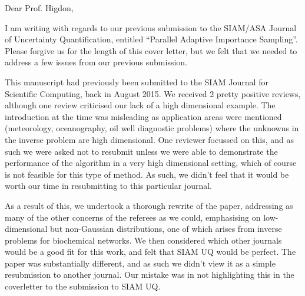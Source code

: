 \documentclass{letter}
\begin{document}
\date{}
\begin{letter}{ }

\opening{Dear Prof. Higdon,}

I am writing with regards to our previous submission to the SIAM/ASA Journal of Uncertainty Quantification, entitled ``Parallel Adaptive Importance Sampling''. Please forgive us for the length of this cover letter, but we felt that we needed to address a few issues from our previous submission.

This manuscript had previously been submitted to the SIAM Journal for Scientific Computing, back in August 2015. We received 2 pretty positive reviews, although one review criticised our lack of a high dimensional example. The introduction at the time was misleading as application areas were mentioned (meteorology, oceanography, oil well diagnostic problems) where the unknowns in the inverse problem are high dimensional. One reviewer focussed on this, and as such we were asked not to resubmit unless we were able to demonstrate the performance of the algorithm in a very high dimensional setting, which of course is not feasible for this type of method. As such, we didn't feel that it would be worth our time in resubmitting to this particular journal.

As a result of this, we undertook a thorough rewrite of the paper, addressing as many of the other concerns of the referees as we could, emphasising on low-dimensional but non-Gaussian distributions, one of which arises from inverse problems for biochemical networks. We then considered which other journals would be a good fit for this work, and felt that SIAM UQ would be perfect. The paper was substantially different, and as such we didn't view it as a simple resubmission to another journal. Our mistake was in not highlighting this in the coverletter to the submission to SIAM UQ.


\end{letter}
\end{document}
